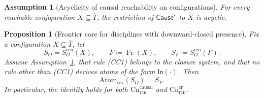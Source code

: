 \documentclass[twoside]{article}
\DeclareMathOperator{\Fr}{Fr}
\newtheorem{proposition}[theorem]{Proposition}
\newtheorem{assumption}[theorem]{Assumption}
\newcommand{\Cn}{\mathrm{Cn}}
\newcommand{\Atom}{\mathrm{Atom}}
\newcommand{\1}{\mathbf{1}}
\begin{document}
\begin{assumption}[Acyclicity of causal reachability on configurations]
\label{assm:rcn-acyclic}
For every reachable configuration \(X\subseteq\overline{T}\), the restriction of
\(\mathsf{Cause}^\star\) to \(X\) is acyclic.
\end{assumption}

\begin{proposition}[Frontier core for disciplines with downward-closed presence]
\label{prop:frontier-core-downward}
Fix a configuration \(X\subseteq\overline{T}\), let
\[
S_O=S_O^{\mathrm{rcn}}(X), \qquad F\coloneqq \Fr(X), \qquad S_F\coloneqq S_O^{\mathrm{rcn}}(F).
\]
Assume Assumption~\ref{assm:rcn-acyclic}, that rule \emph{(CC1)} belongs to the closure system,
and that no rule other than \emph{(CC1)} derives atoms of the form \(\mathsf{In}(\cdot)\).
Then
\[
\Atom_{\mathrm{rev}}(S_O)=S_F.
\]
In particular, the identity holds for both \(\Cn^{\mathrm{causal}}_{\mathrm{rcn}}\) and
\(\Cn^{\mathrm{cr}}_{\mathrm{rcn}}\).
\end{proposition}
\end{document}
